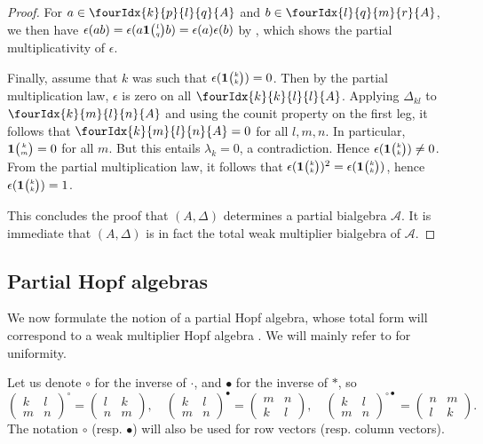 \documentclass[10pt]{article}
\newcommand{\Grt}[3]{#1{\tiny{\begin{pmatrix} #2\\#3\end{pmatrix}}}}
\newcommand{\UnitC}[2]{\Grt{\mathbf{1}}{#1}{#2}}
\newcommand{\Gr}[5]{\fourIdx{#2}{#4}{#3}{#5}{#1}}%
\newcommand{\wmult}{\cdot}
\newcommand{\bmult}{*}
\theoremstyle{definition}
\numberwithin{equation}{section}
\begin{document}
\begin{proof}
For $a\in \Gr{A}{k}{l}{p}{q}$ and $b\in \Gr{A}{l}{m}{q}{r}$, we then have $\epsilon(ab) = \epsilon(a\UnitC{l}{q}b) = \epsilon(a)\epsilon(b)$ by \cite[Proposition 2.6.(4)]{Boh1}, which shows the partial multiplicativity of $\epsilon$. 

Finally, assume that $k$ was such that $\epsilon(\UnitC{k}{k})=0$. Then by the partial multiplication law, $\epsilon$ is zero on all $\Gr{A}{k}{l}{k}{l}$. Applying $\Delta_{kl}$ to $\Gr{A}{k}{l}{m}{n}$ and using the counit property on the first leg, it follows that $\Gr{A}{k}{l}{m}{n}=0$ for all $l,m,n$. In particular, $\UnitC{k}{m}=0$ for all $m$. But this entails $\lambda_k=0$, a contradiction. Hence $\epsilon(\UnitC{k}{k})\neq 0$. From the partial multiplication law, it follows that $\epsilon(\UnitC{k}{k})^2 = \epsilon(\UnitC{k}{k})$, hence $\epsilon(\UnitC{k}{k})=1$.

This concludes the proof that $(A,\Delta)$ determines a partial bialgebra $\mathscr{A}$. It is immediate that $(A,\Delta)$ is in fact the total weak multiplier bialgebra of $\mathscr{A}$. 
\end{proof} 


\subsection{Partial Hopf algebras}

We now formulate the notion of a partial Hopf algebra, whose total form will correspond to a weak multiplier Hopf algebra \cite{Boh1,VDW2,VDW1}. We will mainly refer to \cite{Boh1} for uniformity.

 Let us denote $\circ$ for the inverse of $\wmult$, and $\bullet$ for the inverse of $\bmult$, so \[\begin{pmatrix} k & l \\ m & n \end{pmatrix}^{\circ} = \begin{pmatrix} l & k \\ n & m \end{pmatrix},\quad \begin{pmatrix} k & l \\ m & n \end{pmatrix}^{\bullet} = \begin{pmatrix} m & n \\ k & l \end{pmatrix},\quad \begin{pmatrix} k & l \\ m & n \end{pmatrix}^{\circ \bullet} = \begin{pmatrix} n & m \\ l & k \end{pmatrix}.\] The notation $\circ$ (resp. $\bullet$) will also be used for row vectors (resp. column vectors).
\end{document}
